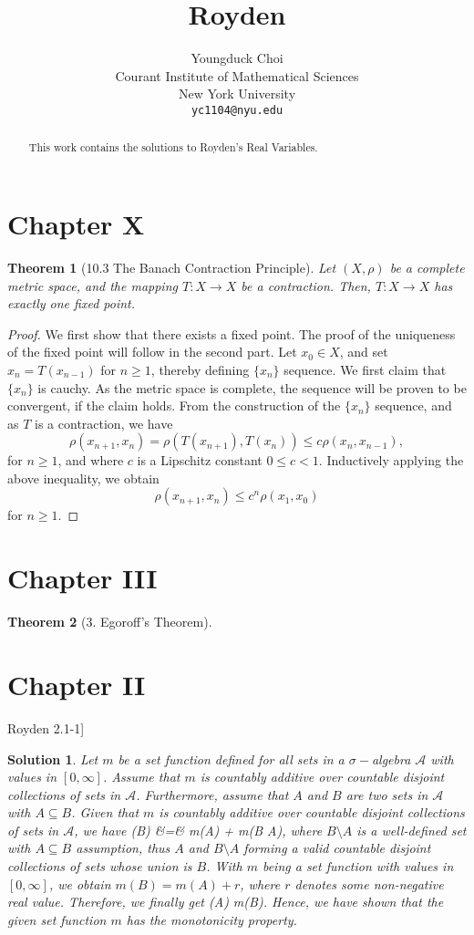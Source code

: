 \documentclass{article} %
\title{Royden}
\author{
Youngduck Choi \\
Courant Institute of Mathematical Sciences \\
New York University \\
\texttt{yc1104@nyu.edu} \\
}
\def\eQb#1\eQe{\begin{eqnarray*}#1\end{eqnarray*}}
\def\Qb#1\Qe{\begin{question}#1\end{question}}
\theoremstyle{quest}
\newtheorem*{theorem}{Theorem}
\newtheorem*{question}{Question}
\newtheorem*{solution}{Solution}
\begin{document}
\maketitle

\begin{abstract}
This work contains the solutions to Royden's Real Variables.
\end{abstract}


\section{Chapter X}
\begin{theorem}[10.3 The Banach Contraction Principle]
Let $(X,\rho)$ be a complete metric space, and the mapping $T: X \to X$ be a contraction.
Then, $T:X \to X$ has exactly one fixed point.
\end{theorem}
\begin{proof}
We first show that there exists a fixed point. The proof of the uniqueness 
of the fixed point will follow in the second part. 
Let $x_0 \in X$, and set $x_{n} = T(x_{n-1})$ for $n \geq 1$, thereby defining 
$\{ x_n\}$ sequence. We first claim that $\{ x_n \}$ is cauchy. As the
metric space is complete, the sequence will be proven to be convergent, if the claim holds.
From the construction of the $\{ x_n \}$ sequence, and as $T$ is a contraction, we have
\[
\rho(x_{n+1},x_n) = \rho(T(x_{n+1}),T(x_n)) \leq c\rho(x_n, x_{n-1}),
\]
for $n \geq 1$, and
where $c$ is a Lipschitz constant $0 \leq c < 1$. Inductively applying the above
inequality, we obtain
\[
\rho(x_{n+1},x_n) \leq c^{n} \rho(x_{1}, x_0) 
\]
for $n \geq 1$.
\end{proof}

\section{Chapter III}
\begin{theorem}[3. Egoroff's Theorem]
\end{theorem}

\section{Chapter II}
\Qb[Royden 2.1-1]
\Qe
\begin{solution}
Let $m$ be a set function defined for all sets in a $\sigma-$algebra $\mathcal{A}$ 
with values in $[0, \infty]$. Assume that $m$ is countably additive over countable 
disjoint collections of sets in $\mathcal{A}$. Furthermore, 
assume that $A$ and $B$ are two sets in
$\mathcal{A}$ with $A \subseteq B$. 
Given that $m$ is countably additive over countable disjoint collections of sets in
$\mathcal{A}$, we have 
\eQb
m(B) &=& m(A) + m(B \setminus A),
\eQe
where $B \setminus A$ is a well-defined set with $A \subseteq B$ assumption, thus
$A$ and $B \setminus A$ forming a valid countable disjoint collections of sets 
whose union is $B$.
With $m$ being
a set function with values in $[0, \infty]$, we obtain
$m(B) = m(A) + r$,
where $r$ denotes some non-negative real value. Therefore, we finally get
\eQb
m(A) \leq m(B).
\eQe
Hence, we have shown that the given set function $m$ has the monotonicity 
property.
\end{solution}
\end{document}

